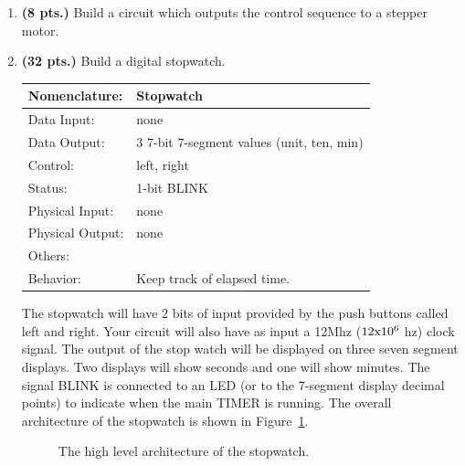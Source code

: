 \begin{enumerate}
\item{\bf (8 pts.)} Build a circuit which outputs the control sequence
to a stepper motor.

\item{\bf (32 pts.)} Build a digital stopwatch.

\begin{tabular}{|l|p{3.5in}|} \hline
Nomenclature:  & Stopwatch         \\ \hline
Data Input:    & none         \\ \hline
Data Output:   & 3 7-bit 7-segment values (unit, ten, min)   \\ \hline
Control:       & left, right           \\ \hline
Status:        & 1-bit BLINK                         \\ \hline
Physical Input:& none        \\ \hline
Physical Output:& none          \\ \hline
Others:        &            \\ \hline
Behavior:      & Keep track of elapsed time. \\ \hline
\end{tabular}

The stopwatch will have 2 bits of input provided by the
push buttons called left and right.  Your circuit will also have as 
input a 12Mhz ($12{\rm x}10^6$ hz) clock signal.   The output of the stop 
watch will be displayed on three seven segment displays.  Two 
displays will show seconds and one will show minutes.   The signal
BLINK is connected to an LED (or to the 7-segment display decimal points)
to indicate when the main TIMER is running.  The overall
architecture of the stopwatch is shown in Figure~\ref{fig:stopwatch_dp}.

\begin{figure}[ht]
\caption{The high level architecture of the stopwatch.}
\label{fig:stopwatch_dp}
\end{figure}


\end{enumerate}
